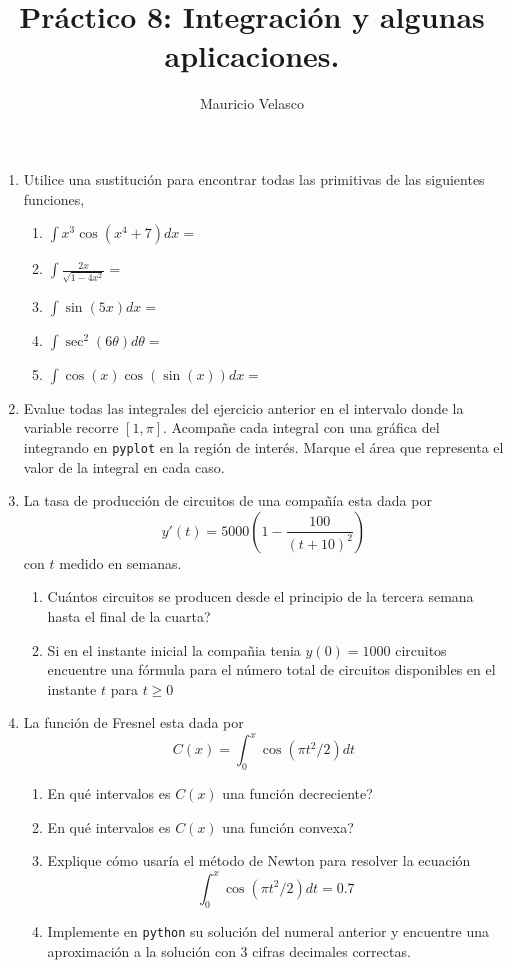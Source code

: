 \documentclass[12pt, a4paper]{article}
\date{}
\begin{document}
\title{Pr\'actico 8: Integración y algunas aplicaciones.}
\author{Mauricio Velasco}
\maketitle{}
\begin{enumerate}
\item Utilice una sustitución para encontrar todas las primitivas de las siguientes funciones,
\begin{enumerate}
\item $\int x^3\cos(x^4+7)dx =$
\item $\int \frac{2x}{\sqrt{1-4x^2}} =$
\item $\int \sin(5x)dx =$
\item $\int \sec^2(6\theta)d\theta=$
\item $\int \cos(x)\cos(\sin(x))dx=$
\end{enumerate}

\item Evalue todas las integrales del ejercicio anterior en el intervalo donde la variable recorre $[1,\pi]$. Acompañe cada integral con una gráfica del integrando en \verb!pyplot! en la región de interés. Marque el área que representa el valor de la integral en cada caso.

\item La tasa de producción de circuitos de una compañía esta dada por
\[y'(t) = 5000\left(1-\frac{100}{(t+10)^2}\right)\]
con $t$ medido en semanas.
\begin{enumerate}
\item Cuántos circuitos se producen desde el principio de la tercera semana hasta el final de la cuarta? 
\item Si en el instante inicial la compañia tenia $y(0)=1000$ circuitos encuentre una fórmula para el número total de circuitos disponibles en el instante $t$ para $t\geq 0$
\end{enumerate}

\item La función de Fresnel esta dada por
\[C(x)=\int_0^x\cos(\pi t^2/2)dt\]
\begin{enumerate}
\item En qué intervalos es $C(x)$ una función decreciente?
\item En qué intervalos es $C(x)$ una función convexa?
\item Explique cómo usaría el método de Newton para resolver la ecuación 
\[\int_0^x\cos(\pi t^2/2)dt = 0.7\]
\item Implemente en \verb!python! su solución del numeral anterior y encuentre una aproximación a la solución con $3$ cifras decimales correctas.
\end{enumerate}  


\end{enumerate}
\end{document}
